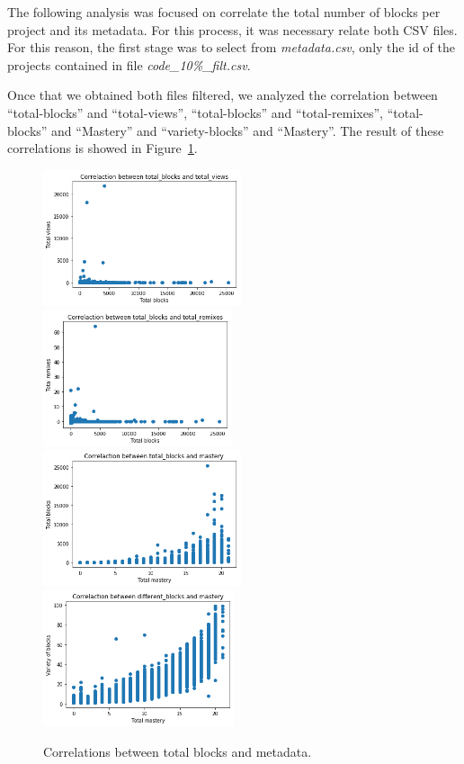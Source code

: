 \documentclass[a4paper,twocolumn,10pt]{article}
\begin{document}
The following analysis was focused on correlate the total number of blocks per project
and its metadata. For this process, it was necessary relate both CSV files. For this
reason, the first stage was to select from \textit{metadata.csv}, only the id of the
projects contained in file \textit{code\_10\%\_filt.csv}.

Once that we obtained both files filtered, we analyzed the correlation between 
``total-blocks'' and ``total-views'', ``total-blocks'' and ``total-remixes'', 
``total-blocks'' and ``Mastery'' and ``variety-blocks'' and ``Mastery''. The result
of these correlations is showed in Figure~\ref{tab:corr_2}.

\begin{figure}
\begin{center}
\includegraphics[height=4cm]{images/3.png}
\includegraphics[height=4cm]{images/4.png}
\includegraphics[height=4cm]{images/5.png}
\includegraphics[height=4cm]{images/6.png}
\caption{Correlations between total blocks and metadata.}
\label{tab:corr_2}
\end{center}
\end{figure}
\end{document}

